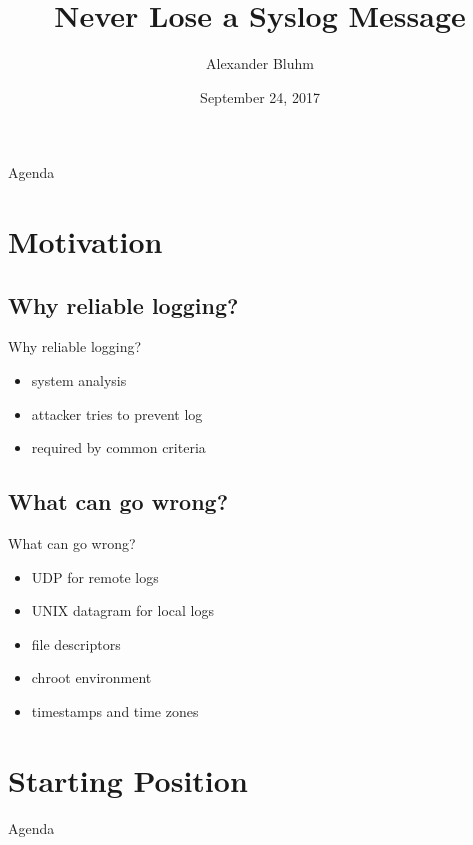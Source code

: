 \documentclass[14pt]{beamer}
\author{Alexander Bluhm}
\title{Never Lose a Syslog Message}
\institute{\url{bluhm@openbsd.org}}
\date{September 24, 2017}
\begin{document}
\begin{frame}
\titlepage
\end{frame}

\begin{frame}{Agenda}
\setcounter{tocdepth}{1}
\tableofcontents
\end{frame}

\section{Motivation}

\subsection{Why reliable logging?}
\begin{frame}{Why reliable logging?}
\begin{itemize}
    \item system analysis
    \item attacker tries to prevent log
    \item required by common criteria
\end{itemize}
\end{frame}

\subsection{What can go wrong?}
\begin{frame}{What can go wrong?}
\begin{itemize}
    \item UDP for remote logs
    \item UNIX datagram for local logs
    \item file descriptors
    \item chroot environment
    \item timestamps and time zones
\end{itemize}
\end{frame}

\section{Starting Position}

\begin{frame}{Agenda}
\tableofcontents[currentsection]
\end{frame}
\end{document}
